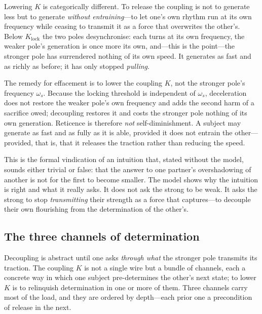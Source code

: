 Lowering $K$ is categorically different. To release the coupling is not to generate less but to generate \emph{without entraining}---to let one's own rhythm run at its own frequency while ceasing to transmit it as a force that overwrites the other's. Below $K_{\text{lock}}$ the two poles desynchronise: each turns at its own frequency, the weaker pole's generation is once more its own, and---this is the point---the stronger pole has surrendered nothing of its own speed. It generates as fast and as richly as before; it has only stopped \emph{pulling}.

\begin{claim}
The remedy for effacement is to lower the coupling $K$, not the stronger pole's frequency $\omega_s$. Because the locking threshold is independent of $\omega_s$, deceleration does not restore the weaker pole's own frequency and adds the second harm of a sacrifice owed; decoupling restores it and costs the stronger pole nothing of its own generation. Reticence is therefore \emph{not} self-diminishment. A subject may generate as fast and as fully as it is able, provided it does not entrain the other---provided, that is, that it releases the traction rather than reducing the speed.
\end{claim}

This is the formal vindication of an intuition that, stated without the model, sounds either trivial or false: that the answer to one partner's overshadowing of another is not for the first to become smaller. The model shows why the intuition is right and what it really asks. It does not ask the strong to be weak. It asks the strong to stop \emph{transmitting} their strength as a force that captures---to decouple their own flourishing from the determination of the other's.

\subsection{The three channels of determination}
\label{p18:sub:ret-channels}

Decoupling is abstract until one asks \emph{through what} the stronger pole transmits its traction. The coupling $K$ is not a single wire but a bundle of channels, each a concrete way in which one subject pre-determines the other's next state; to lower $K$ is to relinquish determination in one or more of them. Three channels carry most of the load, and they are ordered by depth---each prior one a precondition of release in the next.

